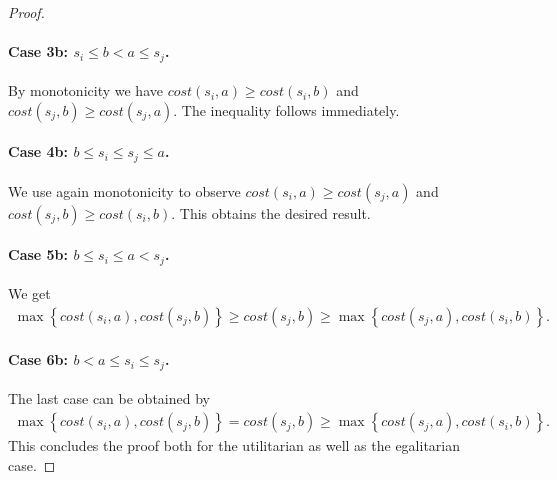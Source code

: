 \documentclass[a4paper]{article}
\newcommand{\cost}{\mathit{cost}}
\begin{document}
\begin{proof}
\paragraph*{Case 3b: $s_i \leq b < a \leq s_j$.}
By monotonicity we have $\cost(s_i,a)\geq \cost(s_i,b)$ and $\cost(s_j,b) \geq \cost(s_j,a)$. The inequality follows immediately.
\paragraph*{Case 4b: $b \leq s_i \leq s_j \leq a$.}
We use again monotonicity to observe $\cost(s_i,a) \geq \cost(s_j,a)$ and $\cost(s_j,b) \geq \cost(s_i,b)$. This obtains the desired result.
\paragraph*{Case 5b: $b \leq s_i \leq a < s_j$.}
We get
\begin{align*}
    \max \left\{\cost(s_i,a), \cost(s_j,b)\right\} \geq \cost(s_j,b) \geq \max \left\{\cost(s_j,a),\cost(s_i,b)\right\}.
\end{align*}
\paragraph*{Case 6b: $b < a \leq s_i \leq s_j$.}
The last case can be obtained by
\begin{align*}
      \max \left\{\cost(s_i,a), \cost(s_j,b)\right\} = \cost(s_j,b) \geq \max \left\{\cost(s_j,a),\cost(s_i,b)\right\}.  
\end{align*}
This concludes the proof both for the utilitarian as well as the egalitarian case.
\end{proof}

\lemmacompact*
\end{document}
